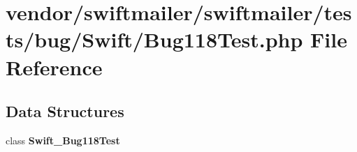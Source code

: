 \section{vendor/swiftmailer/swiftmailer/tests/bug/\+Swift/\+Bug118\+Test.php File Reference}
\label{_bug118_test_8php}
\subsection*{Data Structures}
\begin{DoxyCompactItemize}
\item 
class {\bf Swift\+\_\+\+Bug118\+Test}
\end{DoxyCompactItemize}
